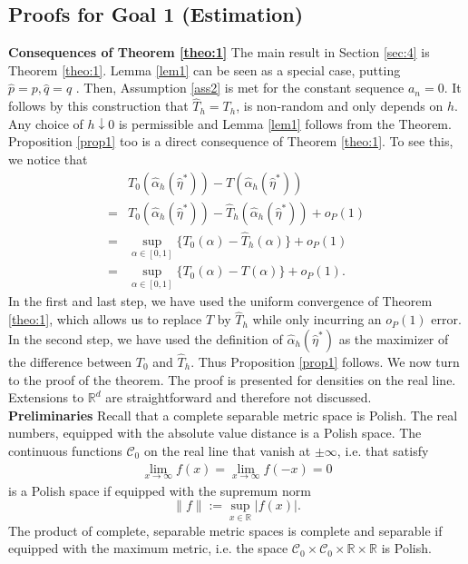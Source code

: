\subsection{Proofs for Goal 1 (Estimation)}

\textbf{Consequences of Theorem \ref{theo:1}} The main result in Section \ref{sec:4} is Theorem \ref{theo:1}. Lemma \ref{lem1} can be seen as a special case, putting $\hat p=p, \hat q=q$ . Then, Assumption \ref{ass2} is met for the constant sequence $a_n=0$. It follows by this construction that $\hat T_h =T_h$, is non-random and only depends on $h$. Any choice of $h\downarrow 0$ is permissible and  Lemma \ref{lem1} follows from the Theorem. Proposition \ref{prop1} too is a direct consequence of Theorem \ref{theo:1}. To see this, we notice that
\begin{align*}
    & T_0(\hat \alpha_h(\hat \eta^*)) - T(\hat \alpha_h(\hat \eta^*)) \\
    =& T_0(\hat \alpha_h(\hat \eta^*)) - \hat T_h(\hat \alpha_h(\hat \eta^*))+o_P(1)\\
    = & \sup_{\alpha \in [0,1]}\{T_0(\alpha) - \hat T_h(\alpha)\}+o_P(1)\\
    =& \sup_{\alpha \in [0,1]}\{T_0(\alpha) -  T(\alpha)\}+o_P(1).
\end{align*}
In the first and last step, we have used the uniform convergence of Theorem \ref{theo:1}, which allows us to replace $T$ by $\hat T_h$ while only incurring an $o_P(1)$ error. In the second step, we have used the definition of $\hat \alpha_h(\hat \eta^*)$ as the maximizer of the difference between $T_0$ and $\hat T_h$. Thus Proposition \ref{prop1} follows. We now turn to the proof of the theorem. The proof is presented for densities on the real line. Extensions to $\mathbb{R}^d$ are straightforward and therefore not discussed. \\
\textbf{Preliminaries} Recall that a complete separable metric space is Polish. The real numbers, equipped with the absolute value distance is a Polish space. The continuous functions $\mathcal{C}_0$ on the real line that vanish at $\pm \infty$, i.e. that satisfy
\begin{align} \label{e:decay}
\lim_{x \to \infty} f(x) = \lim_{x \to \infty} f(-x)=0 
\end{align}
is a Polish space if equipped with the supremum norm
\[
\|f\|:= \sup_{x \in \mathbb{R}}|f(x)|.
\] 
The product of complete, separable metric spaces is complete and separable if equipped with the maximum metric, i.e. the space $\mathcal{C}_0 \times \mathcal{C}_0\times \mathbb{R}\times \mathbb{R}$ is Polish. 
